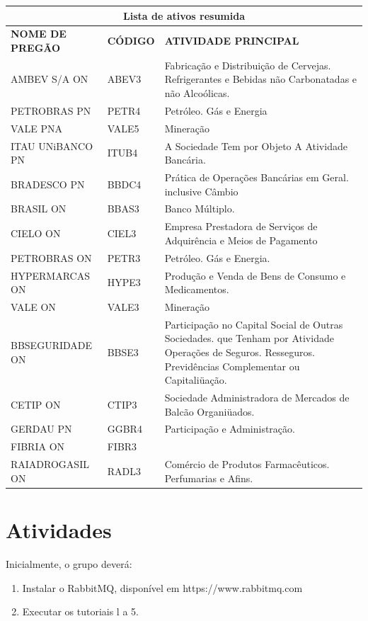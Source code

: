 \documentclass[12pt,brazil, a4paper, fullpage]{article}
\begin{document}
\begin{tabular}{llp{10cm}}
    \toprule
    \multicolumn{3}{c}{\textbf{Lista de ativos resumida}}  \\
    \midrule
    \textbf{NOME DE PREGÃO} & \textbf{CÓDIGO} & \textbf{ATIVIDADE PRINCIPAL} \\
    AMBEV S/A ON & ABEV3 & Fabricação e Distribuição de Cervejas. Refrigerantes e Bebidas não Carbonatadas e não Alcoólicas. \\
    PETROBRAS PN & PETR4 & Petróleo. Gás e Energia \\
    VALE PNA & VALE5 & Mineração \\
    ITAU UNiBANCO PN & ITUB4 & A Sociedade Tem por Objeto A Atividade Bancária. \\
    BRADESCO PN & BBDC4 & Prática de Operações Bancárias em Geral. inclusive Câmbio \\
    BRASIL ON & BBAS3 & Banco Múltiplo. \\
    CIELO ON & CIEL3 & Empresa Prestadora de Serviços de Adquirência e Meios de Pagamento \\
    PETROBRAS ON & PETR3 & Petróleo. Gás e Energia. \\
    HYPERMARCAS ON & HYPE3 & Produção e Venda de Bens de Consumo e Medicamentos. \\
    VALE ON & VALE3 & Mineração \\
    BBSEGURIDADE ON & BBSE3 & Participação no Capital Social de Outras Sociedades. que Tenham por Atividade Operações de Seguros. Resseguros. Previdências Complementar ou Capitaliüação. \\
    CETIP ON & CTIP3 & Sociedade Administradora de Mercados de Balcão Organiüados. \\
    GERDAU PN & GGBR4 & Participação e Administração. \\
    FIBRIA ON & FIBR3 &  \\
    RAIADROGASIL ON & RADL3 & Comércio de Produtos Farmacêuticos. Perfumarias e Afins. \\
    \bottomrule
\end{tabular}%

\section{Atividades}

Inicialmente, o grupo deverá:
\begin{enumerate}
    \item 	Instalar o RabbitMQ, disponível em https://www.rabbitmq.com
    \item 	Executar os tutoriais l a 5.
\end{enumerate}
\end{document}
